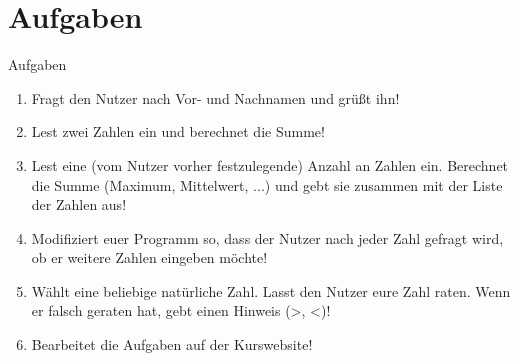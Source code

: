 \section{Aufgaben}
\begin{frame}{Aufgaben}
	\begin{enumerate}
	\item Fragt den Nutzer nach Vor- und Nachnamen und grüßt ihn!
	\item Lest zwei Zahlen ein und berechnet die Summe!
	\item Lest eine (vom Nutzer vorher festzulegende) Anzahl an Zahlen ein. Berechnet die Summe (Maximum, Mittelwert, ...) und gebt sie zusammen mit der Liste der Zahlen aus!
	\item Modifiziert euer Programm so, dass der Nutzer nach jeder Zahl gefragt wird, ob er weitere Zahlen eingeben möchte!
	\item Wählt eine beliebige natürliche Zahl. Lasst den Nutzer eure Zahl raten. Wenn er falsch geraten hat, gebt einen Hinweis (>, <)!
	\item Bearbeitet die Aufgaben auf der Kurswebsite!
	\end{enumerate}
\end{frame}


